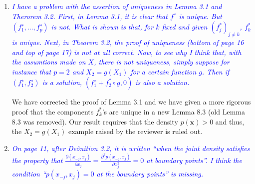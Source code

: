 \documentclass[pdftex,12pt]{article}
\def\E{{\mathbb E}}
\def\rc#1{{\it\textcolor{blue}{#1}}\smallskip}
\begin{document}
\begin{enumerate}
\item \rc{I have a problem with the assertion of
  uniqueness in Lemma 3.1 and Therorem 3.2. First, in Lemma 3.1, it is
  clear that $f^∗$ is unique. But $(f_1^∗, \ldots, f_p^∗)$ is not. What is
  shown is that, for $k$ fixed and given $(f_j^*)_{j\neq k}$, $f_k^*$ is unique. Next,
  in Theorem 3.2, the proof of uniqueness (bottom of page 16 and top
  of page 17) is not at all correct.
   Now, to see why I think that, with the assumtions made on $X$, there is
   not uniqueness, simply suppose for instance that $p = 2$ and $X_2 = g(X_1)$
   for a certain function $g$. Then if $(f_1^∗, f_2^∗)$ is a solution,
   $(f_1^∗ + f_2^* \circ g, 0)$ is also a solution.}


We have corrected the proof of Lemma 3.1 and we have given a more rigorous proof that the components $f^*_k$'s are unique in a new Lemma 8.3 (old Lemma 8.3 was removed). Our result requires that the density $p(\mathbf{x}) > 0$ and thus, the $X_2 = g(X_1)$ example raised by the reviewer is ruled out. 







\item \rc{On page 11, after Deônition 3.2, it is written ``when the joint
density satisfies the property that
$\frac{\partial(x_{-j},x_j)}{\partial x_j} = \frac{\partial^2 p(x_{-j},
  x_j)}{\partial x_j^2} = 0$ at boundary points''.
I think the condition ``$p(x_{−j}, x_j ) = 0$ at the boundary points'' is
missing.}


\end{enumerate}
\end{document}
